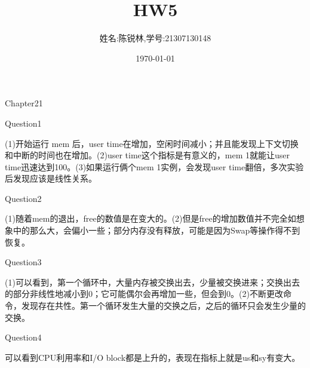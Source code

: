 \documentclass[12pt]{article}
\title{HW5}
\author{姓名:陈锐林,学号:21307130148}
\date{\today}
\begin{document}
\maketitle
\begin{LARGE}
    \noindent Chapter21\\
\end{LARGE}
\begin{large}
	\noindent Question1\\
\end{large}
\hspace*{2em}(1)开始运行 mem 后，user time在增加，空闲时间减小；并且能发现上下文切换和中断的时间也在增加。(2)user time这个指标是有意义的，mem 1就能让user time迅速达到100。(3)如果运行俩个mem 1实例，会发现user time翻倍，多次实验后发现应该是线性关系。\\

\begin{large}
	\noindent Question2\\
\end{large}
\hspace*{2em}(1)随着mem的退出，free的数值是在变大的。(2)但是free的增加数值并不完全如想象中的那么大，会偏小一些；部分内存没有释放，可能是因为Swap等操作得不到恢复。\\

\begin{large}
	\noindent Question3\\
\end{large}
\hspace*{2em}(1)可以看到，第一个循环中，大量内存被交换出去，少量被交换进来；交换出去的部分非线性地减小到0；它可能偶尔会再增加一些，但会到0。(2)不断更改命令，发现存在共性。第一个循环发生大量的交换之后，之后的循环只会发生少量的交换。\\

\begin{large}
	\noindent Question4\\
\end{large}
\hspace*{2em}可以看到CPU利用率和I/O block都是上升的，表现在指标上就是us和sy有变大。\\
\end{document}
